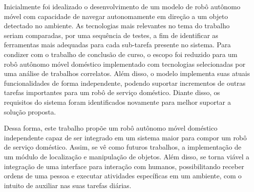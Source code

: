 Inicialmente foi idealizado o desenvolvimento de um modelo de robô autônomo móvel com capacidade de navegar autonomamente em direção a um objeto detectado no ambiente. As tecnologias mais relevantes no tema do trabalho seriam comparadas, por uma sequência de testes, a fim de identificar as ferramentas mais adequadas para cada sub-tarefa presente no sistema. Para condizer com o trabalho de conclusão de curso, o escopo foi reduzido para um robô autônomo móvel doméstico implementado com tecnologias selecionadas por uma análise de trabalhos correlatos. Além disso, o modelo implementa suas atuais funcionalidades de forma independente, podendo suportar incrementos de outras tarefas importantes para um robô de serviço doméstico. Diante disso, os requisitos do sistema foram identificados novamente para melhor suportar a solução proposta.

Dessa forma, este trabalho propõe um robô autônomo móvel doméstico independente capaz de ser integrado em um sistema maior para compor um robô de serviço doméstico. Assim, se vê como futuros trabalhos, a implementação de um módulo de localização e manipulação de objetos. Além disso, se torna viável a integração de uma interface para interação com humanos, possibilitando receber ordens de uma pessoa e executar atividades específicas em um ambiente, com o intuito de auxiliar nas suas tarefas diárias.